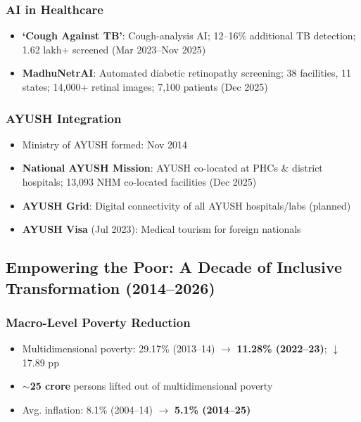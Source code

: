 \subsubsection*{AI in Healthcare}

\begin{itemize}
  \item \textbf{`Cough Against TB'}: Cough-analysis AI; 12--16\% additional TB detection; 1.62 lakh+ screened (Mar 2023--Nov 2025)
  \item \textbf{MadhuNetrAI}: Automated diabetic retinopathy screening; 38 facilities, 11 states; 14,000+ retinal images; 7,100 patients (Dec 2025)
\end{itemize}

\subsubsection*{AYUSH Integration}

\begin{itemize}
  \item Ministry of AYUSH formed: Nov 2014
  \item \textbf{National AYUSH Mission}: AYUSH co-located at PHCs \& district hospitals; 13,093 NHM co-located facilities (Dec 2025)
  \item \textbf{AYUSH Grid}: Digital connectivity of all AYUSH hospitals/labs (planned)
  \item \textbf{AYUSH Visa} (Jul 2023): Medical tourism for foreign nationals
\end{itemize}


\subsection{Empowering the Poor: A Decade of Inclusive Transformation (2014--2026)}

\subsubsection*{Macro-Level Poverty Reduction}
\begin{itemize}
  \item Multidimensional poverty: 29.17\% (2013--14) $\rightarrow$ \textbf{11.28\% (2022--23)}; $\downarrow$17.89 pp
  \item \textbf{$\sim$25 crore} persons lifted out of multidimensional poverty
  \item Avg. inflation: 8.1\% (2004--14) $\rightarrow$ \textbf{5.1\% (2014--25)}
\end{itemize}

